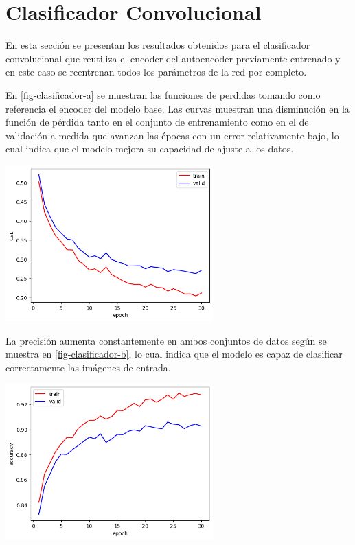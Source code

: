 \documentclass[aps,prl,reprint,groupedaddress]{revtex4-2}
\newenvironment{Figura}
  {\par\medskip\noindent\minipage{\linewidth}}
  {\endminipage\par\medskip}
\begin{document}
\section{Clasificador Convolucional}

En esta sección se presentan los resultados obtenidos para el clasificador
convolucional que reutiliza el encoder del autoencoder previamente entrenado y 
en este caso se reentrenan todos los parámetros de la red por completo.

En \ref{fig-clasificador-a} se muestran las funciones de perdidas tomando como 
referencia el encoder del modelo base. Las curvas muestran una disminución en la 
función de pérdida tanto en el conjunto de entrenamiento como en el de validación 
a medida que avanzan las épocas con un error relativamente bajo, lo cual indica 
que el modelo mejora su capacidad de ajuste a los datos.
\begin{Figura}
  \centering
  \includegraphics[width=0.60\textwidth]{figs1/modelo_con_clasificador_a.png}
  \label{fig-clasificador-a}
\end{Figura}

La precisión aumenta constantemente en ambos conjuntos de datos según se muestra 
en \ref{fig-clasificador-b}, lo cual indica que el modelo es capaz de clasificar 
correctamente las imágenes de entrada.
\begin{Figura}
  \centering
  \includegraphics[width=0.60\textwidth]{figs1/modelo_con_clasificador_b.png}
  \label{fig-clasificador-b}
\end{Figura}
\end{document}
